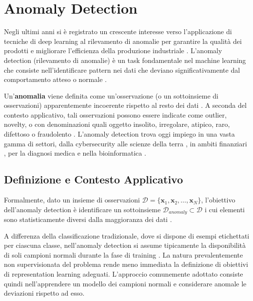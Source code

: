 \section{Anomaly Detection}
\label{sec:anomaly_detection}

Negli ultimi anni si è registrato un crescente interesse verso l'applicazione di tecniche di deep learning al rilevamento di anomalie per garantire la qualità dei prodotti e migliorare l'efficienza della produzione industriale \cite{zhuo2025survey}. L'anomaly detection (rilevamento di anomalie) è un task fondamentale nel machine learning che consiste nell'identificare pattern nei dati che deviano significativamente dal comportamento atteso o normale \cite{chandola2009anomaly}. 

Un'\textbf{anomalia} viene definita come un'osservazione (o un sottoinsieme di osservazioni) apparentemente incoerente rispetto al resto dei dati \cite{barnett1994outliers}. A seconda del contesto applicativo, tali osservazioni possono essere indicate come outlier, novelty, o con denominazioni quali oggetto insolito, irregolare, atipico, raro, difettoso o fraudolento \cite{ruff2021anomaly}. L'anomaly detection trova oggi impiego in una vasta gamma di settori, dalla cybersecurity \cite{malaiya2018anomaly} alle scienze della terra \cite{fisher2017anomaly}, in ambiti finanziari \cite{ahmed2016survey}, per la diagnosi medica \cite{baur2019fusing} e nella bioinformatica \cite{min2017deep}.

\subsection{Definizione e Contesto Applicativo}

Formalmente, dato un insieme di osservazioni $\mathcal{D} = \{\mathbf{x}_1, \mathbf{x}_2, \dots, \mathbf{x}_N\}$, l'obiettivo dell'anomaly detection è identificare un sottoinsieme $\mathcal{D}_{anomaly} \subset \mathcal{D}$ i cui elementi sono statisticamente diversi dalla maggioranza dei dati \cite{chandola2009anomaly}. 

A differenza della classificazione tradizionale, dove si dispone di esempi etichettati per ciascuna classe, nell'anomaly detection si assume tipicamente la disponibilità di soli campioni normali durante la fase di training \cite{pimentel2014review}. La natura prevalentemente non supervisionata del problema rende meno immediata la definizione di obiettivi di representation learning adeguati. L'approccio comunemente adottato consiste quindi nell'apprendere un modello dei campioni normali e considerare anomale le deviazioni rispetto ad esso.

